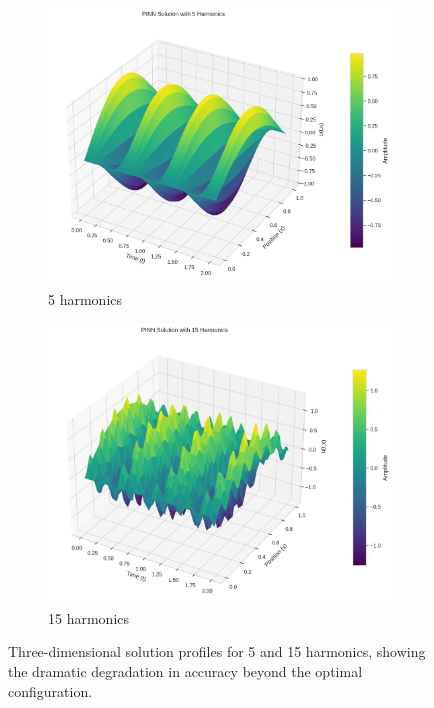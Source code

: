 \begin{figure}[H]
    \centering
    \begin{subfigure}[b]{0.48\textwidth}
        \centering
        \includegraphics[width=\textwidth]{figures/3d_comparison_pinn_solution_5h.png}
        \caption{5 harmonics}
        \label{fig:3d_5h}
    \end{subfigure}
    \hfill
    \begin{subfigure}[b]{0.48\textwidth}
        \centering
        \includegraphics[width=\textwidth]{figures/3d_comparison_pinn_solution_15h.png}
        \caption{15 harmonics}
        \label{fig:3d_15h}
    \end{subfigure}
    \caption{Three-dimensional solution profiles for 5 and 15 harmonics, showing the dramatic degradation in accuracy beyond the optimal configuration.}
    \label{fig:3d_comparison}
\end{figure}


